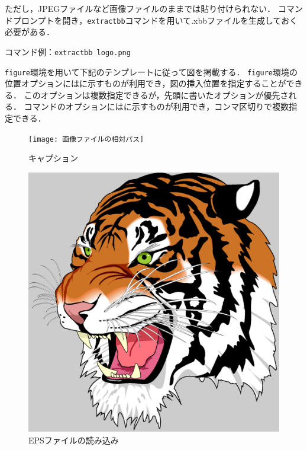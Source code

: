 \documentclass[a4j,11pt]{ujreport}
\begin{document}
ただし，JPEGファイルなど画像ファイルのままでは貼り付けられない．
コマンドプロンプトを開き，\verb|extractbb|コマンドを用いて.xbbファイルを生成しておく必要がある．

コマンド例：\verb|extractbb logo.png|

\texttt{figure}環境を用いて下記のテンプレートに従って図を掲載する．
\texttt{figure}環境の位置オプションにはに示すものが利用でき，図の挿入位置を指定することができる．
このオプションは複数指定できるが，先頭に書いたオプションが優先される．
コマンドのオプションにはに示すものが利用でき，コンマ区切りで複数指定できる．

\begin{code}
\begin{figure}[位置]
	\centering
	\texttt{[image: 画像ファイルの相対パス]}
	\caption{キャプション}
	\label{fig:ラベル}
\end{figure}
\end{code}%

\begin{figure}[ht]
	\centering
	\includegraphics[clip,scale=0.3]{fig/tiger.eps}
	\caption{EPSファイルの読み込み}
	\label{fig:ExampleEPS}
\end{figure}
\end{document}
